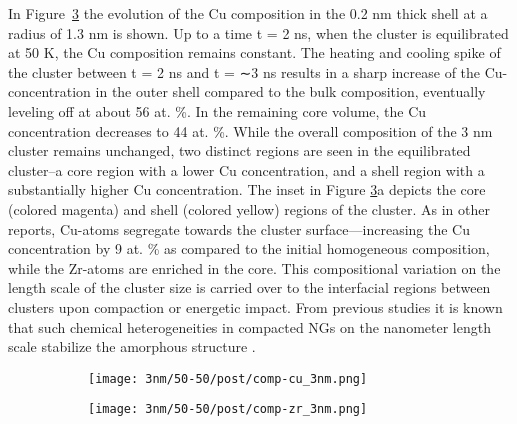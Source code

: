 \begin{selfcite}
In Figure~\ref{f:clus_comp-3nm} the evolution of the Cu composition in the 0.2 nm thick shell at a radius of 1.3 nm is shown. Up to a time t = 2 ns, when the cluster is equilibrated at 50 K, the Cu composition remains constant. The heating and cooling spike of the cluster between t = 2 ns and t = ∼3 ns results in a sharp increase of the Cu-concentration in the outer shell compared to the bulk composition, eventually leveling off at about 56 at. \%. In the remaining core volume, the Cu concentration decreases to 44 at. \%. While the overall composition of the 3 nm cluster remains unchanged, two distinct regions are seen in the equilibrated cluster–a core region with a lower Cu concentration, and a shell region with a substantially higher Cu concentration. The inset in Figure \ref{f:clus_comp-3nm}a depicts the core (colored magenta) and shell (colored yellow) regions of the cluster. As in other reports, Cu-atoms segregate towards the cluster surface—increasing the Cu concentration by 9 at. \% as compared to the initial homogeneous composition, while the Zr-atoms are enriched in the core. This compositional variation on the length scale of the cluster size is carried over to the interfacial regions between clusters upon compaction or energetic impact. From previous studies it is known that such chemical heterogeneities in compacted NGs on the nanometer length scale stabilize the amorphous structure \cite{Adjaoud2016}. \par

\begin{figure}[!ht]
	\begin{subfigure}{0.5\columnwidth} 	\centering
		\texttt{[image: 3nm/50-50/post/comp-cu\_3nm.png]}
		\label{fig:clus_cu_diff}
	\end{subfigure}%
	\hfill
	\begin{subfigure}{0.5\columnwidth} 	\centering
		\texttt{[image: 3nm/50-50/post/comp-zr\_3nm.png]}
		\label{fig:clus_zr_diff}
	\end{subfigure}%
	\label{f:clus_comp-3nm}
\end{figure}
\end{selfcite}